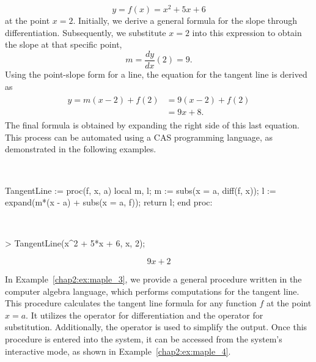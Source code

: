 %
\begin{equation*}
  y = f(x) = x^2 + 5x + 6
\end{equation*}
%
at the point $x = 2$. Initially, we derive a general formula for the slope through differentiation. Subsequently, we substitute $x = 2$ into this expression to obtain the slope at that specific point,
%
\begin{equation*}
  m = \dfrac{dy}{dx}(2) = 9.
\end{equation*}
%
Using the point-slope form for a line, the equation for the tangent line is derived as
%
\begin{equation*}
  \begin{aligned}
    \begin{split}
      y = m(x - 2) + f(2) &= 9(x - 2) + f(2) \\
      &= 9x + 8.
    \end{split}
  \end{aligned}
\end{equation*}
%
The final formula is obtained by expanding the right side of this last equation. This process can be automated using a \ac{CAS} programming language, as demonstrated in the following examples.
%
\begin{example} \phantom{.} \\
  \label{chap2:ex:maple_3}
  \begin{mapleinline}
TangentLine := proc(f, x, a)
  local m, l;
  m := subs(x = a,  diff(f, x));
  l := expand(m*(x - a) + subs(x = a, f));
  return l;
end proc:
  \end{mapleinline}
\end{example}
%
\begin{example} \phantom{.} \\
  \label{chap2:ex:maple_4}
  \begin{mapleinline}
> TangentLine(x^2 + 5*x + 6, x, 2);
    \end{mapleinline}
    \begin{equation*}
      9x + 2
    \end{equation*}
\end{example}
%
In Example~\ref{chap2:ex:maple_3}, we provide a general procedure written in the \Maple{} computer algebra language, which performs computations for the tangent line. This procedure calculates the tangent line formula for any function $f$ at the point $x = a$. It utilizes the  operator for differentiation and the  operator for substitution. Additionally, the  operator is used to simplify the output. Once this procedure is entered into the \Maple{} system, it can be accessed from the system's interactive mode, as shown in Example~\ref{chap2:ex:maple_4}.


